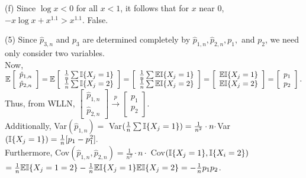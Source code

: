\documentclass[12pt]{article}
\begin{document}
(f) Since $\log x < 0$ for all $x < 1$, it follows that for $x$ near $0$, $-x \log x + x^{1.1} > x^{1.1}$. False.

\pagebreak

\noindent
(5) Since $\hat{p}_{3,n}$ and $p_3$ are determined completely by $\hat{p}_{1,n},\hat{p}_{2,n}, p_1,$ and $p_2$, we need only consider two variables.\\

\noindent
Now, $\mathbb{E} \left[ \begin{array}{c} \hat{p}_{1,n}\\ \hat{p}_{2,n} \end{array} \right]
= \mathbb{E}  \left[ \begin{array}{c} \frac{1}{n} \sum \mathbb{I}\{X_j=1\} \\  \frac{1}{n} \sum \mathbb{I}\{X_j=2\} \end{array} \right]
= \left[ \begin{array}{c} \frac{1}{n} \sum \mathbb{E}\mathbb{I}\{X_j=1\} \\  \frac{1}{n} \sum \mathbb{E}\mathbb{I}\{X_j=2\} \end{array} \right]
= \left[ \begin{array}{c} \mathbb{E}\mathbb{I}\{X_j=1\} \\  \mathbb{E}\mathbb{I}\{X_j=2\} \end{array} \right]
= \left[ \begin{array}{c} p_1\\  p_2 \end{array} \right].$\\
Thus, from WLLN, $\left[ \begin{array}{c} \hat{p}_{1,n}\\ \hat{p}_{2,n} \end{array} \right]
\overset{p}\to \left[ \begin{array}{c} p_1\\  p_2 \end{array} \right]$.\\

\noindent
Additionally, Var$(\hat{p}_{1,n}) =$ Var$(\frac{1}{n}\sum\mathbb{I}\{X_j=1\}) 
= \frac{1}{n^2}\cdot n\cdot $Var$(\mathbb{I}\{X_j=1\})
= \frac{1}{n}[p_1-p_1^2].$\\

\noindent
Furthermore, Cov$(\hat{p}_{1,n},\hat{p}_{2,n}) =  \frac{1}{n^2}\cdot n \cdot$ Cov$(\mathbb{I}\{X_j=1\},\mathbb{I}\{X_i=2\})$\\
\indent \indent $= \frac{1}{n}\mathbb{E} \mathbb{I}\{X_j=1=2\}
-\frac{1}{n}\mathbb{E} \mathbb{I}\{X_j=1\}\mathbb{E}\mathbb{I}\{X_j=2\} = -\frac{1}{n}p_1p_2$.\\
\end{document}
